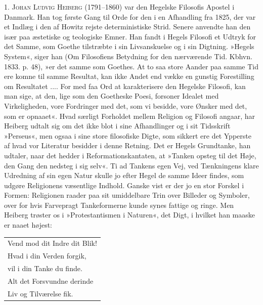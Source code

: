 \documentclass[12pt,a4paper,openany]{book}
\newcommand{\opage}[1]{\marginnote{\footnotesize\textit{[#1]}}}
\begin{document}
1. \textsc{Johan Ludvig Heiberg} (1791--1860) var den
Hegelske Filosofis Apostel i Danmark. Han tog første
Gang til Orde for den i en Afhandling fra 1825, der var
et Indlæg i den af Howitz rejste deterministiske Strid.
Senere anvendte han den især paa æstetiske og teologiske
Emner. Han fandt i Hegels Filosofi et Udtryk for det
Samme, som Goethe tilstræbte i sin Livsanskuelse og i
sin Digtning. »Hegels System«, siger han (Om Filosofiens
Betydning for den nærværende Tid. Kbhvn. 1833.
p. 48), »er det samme som Goethes. At to saa store
Aander paa samme Tid ere komne til samme Resultat,
kan ikke Andet end vække en gunstig Forestilling om
Resultatet .... For med faa Ord at karakterisere den
Hegelske Filosofi, kan man sige, at den, lige som den
Goetheske Poesi, forsoner Idealet med Virkeligheden,
vore Fordringer med det, som vi besidde, vore Ønsker
med det, som er opnaaet«. Hvad særligt Forholdet mellem
Religion og Filosofi angaar, har Heiberg udtalt sig
om det ikke blot i sine Afhandlinger og i sit Tidsskrift
»Perseus«, men ogsaa i sine store filosofiske Digte, som
sikkert ere det Ypperste af hvad vor Literatur besidder
\opage{17}i denne Retning. Det er Hegels Grundtanke, han udtaler,
naar det hedder i Reformationskantaten, at »Tanken opsteg
til det Høje, den Gang den nedsteg i sig selv«. Ti
ad Tankens egen Vej, ved Tænkningens klare Udredning
af sin egen Natur skulle jo efter Hegel de samme Ideer
findes, som udgøre Religionens væsentlige Indhold. Ganske
vist er der jo en stor Forskel i Formen: Religionen
raader paa sit umiddelbare Trin over Billeder og Symboler,
over for hvis Farvepragt Tankeformerne kunde
synes fattige og ringe. Men Heiberg trøster os i »Protestantismen
i Naturen«, det Digt, i hvilket han maaske
er naaet højest:
\begin{center}\small\begin{tabular}{@{}l@{}}
Vend mod dit Indre dit Blik!\\
Hvad i din Verden forgik,\\
vil i din Tanke du finde.\\
Alt det Forsvundne derinde\\
Liv og Tilværelse fik.
\end{tabular}\end{center}
\end{document}
